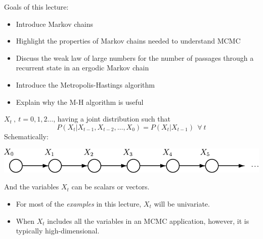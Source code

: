 





Goals of this lecture:
\begin{itemize}
\item Introduce Markov chains
\item Highlight the properties of Markov chains needed to understand MCMC
\item Discuss the weak law of large numbers for the number of passages through a recurrent state in an ergodic Markov chain
\item Introduce the Metropolis-Hastings algorithm
\item Explain why the M-H algorithm is useful
\end{itemize}


$X_t~,~t=0,1,2\ldots$, having a joint distribution such that 
\[
	P(X_t|X_{t-1},X_{t-2},\ldots,X_0) = P(X_t|X_{t-1})~~\forall~t
\]
Schematically:
\begin{center}
\includegraphics[width=\textwidth]{illus/mcdag.pdf}
\end{center}
And the variables $X_t$ can be scalars or vectors.  
\begin{itemize}
\item For most of the {\em examples} in this lecture, $X_t$ will be univariate.
\item When $X_t$ includes all the variables in an MCMC application, however, it is typically high-dimensional.
\end{itemize}



